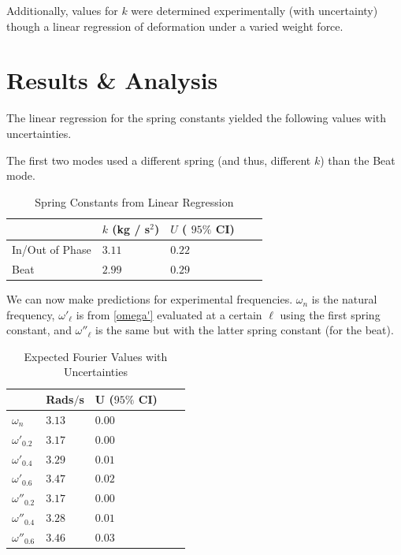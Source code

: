 \documentclass[aps,prl,reprint,10pt,amsmath,amssymb,superscriptaddress,a4paper, floatfix]{revtex4-2}
\begin{document}
Additionally, values for $k$ were determined experimentally (with uncertainty) though a linear regression of deformation under a varied weight force.

\section{Results \& Analysis}

The linear regression for the spring constants yielded the following values with uncertainties. 

The first two modes used a different spring (and thus, different $k$) than the Beat mode.

\begin{table}[h]
\begin{tabular}{@{}lllll@{}}
\toprule
             & $k$ (kg / s$^2$)       & $U$ ( $95 \%$ CI)  \\ \midrule
In/Out of Phase         & $3.11$      & $0.22$     &   \\
Beat         & $2.99$      & $0.29$     & \\ \bottomrule
\end{tabular}
\caption{Spring Constants from Linear Regression}
\end{table}

We can now make predictions for experimental frequencies. $\omega_n$ is the natural frequency, $\omega'_\ell$ is from \ref{omega'} evaluated at a certain $\ell$ using the first spring constant, and $\omega''_\ell$ is the same but with the latter spring constant (for the beat).

\begin{table}[h]
\begin{tabular}{@{}lllll@{}}
\toprule
                    & Rads$/$s    & U ($95 \%$ CI)  & \\ \midrule
$\omega_n$          & $3.13$      & $0.00$          & \\ 
$\omega'_{0.2}$     & $3.17$      & $0.00$          & \\ 
$\omega'_{0.4}$     & $3.29$      & $0.01$          & \\
$\omega'_{0.6}$     & $3.47$      & $0.02$          & \\ 
$\omega''_{0.2}$    & $3.17$      & $0.00$          & \\ 
$\omega''_{0.4}$    & $3.28$      & $0.01$          & \\
$\omega''_{0.6}$    & $3.46$      & $0.03$          & \\ \bottomrule
\end{tabular}
\caption{Expected Fourier Values with Uncertainties}
\end{table}
    
\end{document}
